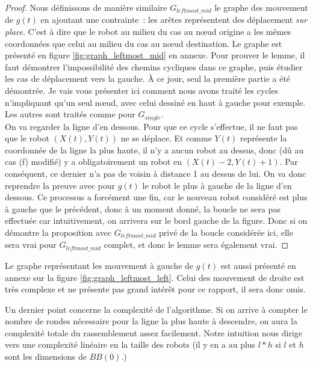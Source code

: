 \begin{proof}

Nous définissons de manière similaire $G_{leftmost\_mid}$ le graphe des
mouvement de $g(t)$ en ajoutant une contrainte~: les arêtes représentent des
déplacement \textit{sur place}. C'est à dire que le robot au milieu du cas au
n\oe{}ud origine a les mêmes coordonnées que celui au milieu du cas au n\oe{}ud
destination.  Le graphe est présenté en figure \ref{fig:graph_leftmost_mid} en
annexe. Pour prouver le lemme, il faut démontrer l'impossibilité des chemins
cycliques dans ce graphe, puis étudier les cas de déplacement vers la gauche.
\`A ce jour, seul la première partie a été démontrée. Je vais vous présenter
ici comment nous avons traité les cycles n'impliquant qu'un seul n\oe{}ud, avec
celui dessiné en haut à gauche pour exemple. Les autres sont traités comme pour
$G_{single}$. \\

On va regarder la ligne d'en dessous. Pour que ce cycle s'effectue, il ne faut
pas que le robot $(X(t),Y(t))$ ne se déplace. Et comme $Y(t)$ représente la
coordonnée de la ligne la plus haute, il n'y a aucun robot au dessus, donc (dû
au cas (f) modifié) y a obligatoirement un robot en $(X(t)-2,Y(t)+1)$. Par
conséquent, ce dernier n'a pas de voisin à distance 1 au dessus de lui. On va
donc reprendre la preuve avec pour $g(t)$ le robot le plus à gauche de la ligne
d'en dessous. Ce processus a forcément une fin, car le nouveau robot considéré
est plus à gauche que le précédent, donc à un moment donné, la boucle ne sera
pas effectuée car intuitivement, on arrivera sur le bord gauche de la figure.
Donc si on démontre la proposition avec $G_{leftmost\_mid}$ privé de la boucle
considérée ici, elle sera vrai pour $G_{leftmost\_mid}$ complet, et donc le
lemme sera également vrai.

\end{proof}

Le graphe représentant les mouvement à gauche de $g(t)$ est aussi présenté en
annexe sur la figure \ref{fig:graph_leftmost_left}. Celui des mouvement de
droite est très complexe et ne présente pas grand intérêt pour ce rapport, il
sera donc omis.

Un dernier point concerne la complexité de l'algorithme. Si on arrive à compter
le nombre de rondes nécessaire pour la ligne la plus haute à descendre, on aura
la complexité totale du rassemblement assez facilement. Notre intuition nous
dirige vers une complexité linéaire en la taille des robots (il y en a au plus
$l*h$ si $l$ et $h$ sont les dimensions de $BB(0)$.) \\

